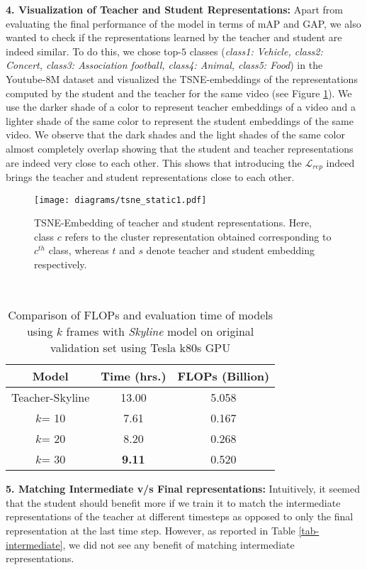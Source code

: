 \documentclass[10pt,twocolumn,letterpaper]{article}
\newcommand{\full}{Teacher-Skyline}
\begin{document}
\noindent\textbf{4. Visualization of Teacher and Student Representations:} Apart from evaluating the final performance of the model in terms of mAP and GAP, we also wanted to check if the representations learned by the teacher and student are indeed similar. To do this, we chose top-$5$ classes (\textit{class1: Vehicle, class2: Concert, class3: Association football, class4: Animal, class5: Food}) in the Youtube-8M dataset and visualized the TSNE-embeddings of the representations computed by the student and the teacher for the same video (see Figure \ref{tsne}). We use the darker shade of a color to represent teacher embeddings of a video and a lighter shade of the same color to represent the student embeddings of the same video. We observe that the dark shades and the light shades of the same color almost completely overlap showing that the student and teacher representations are indeed very close to each other. This shows that introducing the $\mathscr{L}_{rep}$ indeed brings the teacher and student representations close to each other. 
\begin{figure}[t]
\centering
\texttt{[image: diagrams/tsne\_static1.pdf]}
\caption{TSNE-Embedding of teacher and student representations. Here, class $c$ refers to the cluster representation obtained corresponding to $c^{th}$ class, whereas $t$ and $s$ denote teacher and student embedding respectively.}\label{tsne}
\end{figure}\\
\begin{table}[h]
\begin{tabular}{c|c|c}
\toprule
Model  & Time (hrs.) & FLOPs (Billion)\\
\toprule
\full & 13.00 & 5.058 \\
\midrule
$k$= 10 & 7.61 & 0.167\\
$k$= 20 & 8.20 & 0.268\\
$k$= 30 & \textbf{9.11} & 0.520\\
\bottomrule
\end{tabular}
\caption{Comparison of FLOPs and evaluation time of models using $k$ frames with \textit{Skyline} model on original validation set using Tesla k80s GPU}
\label{tab-flops}
\end{table}

\noindent\textbf{5. Matching Intermediate v/s Final representations:} Intuitively, it seemed that the student should benefit more if we train it to match the intermediate representations of the teacher at different timesteps as opposed to only the final representation at the last time step. However, as reported in Table \ref{tab-intermediate}, we did not see any benefit of matching intermediate representations. 
\end{document}
